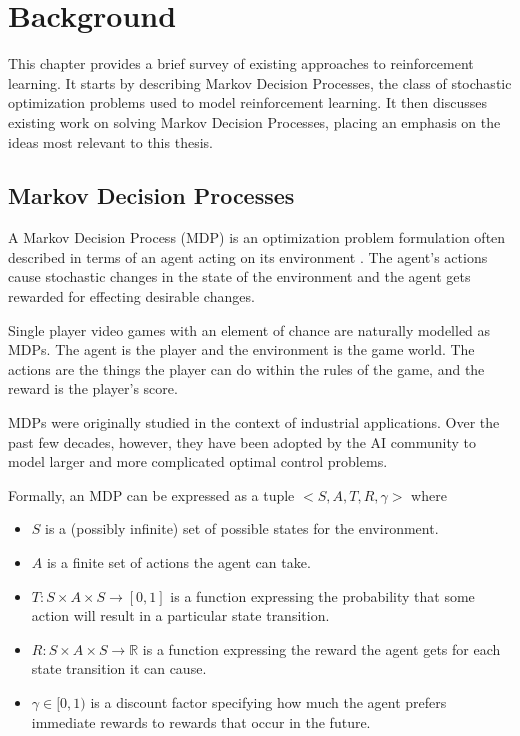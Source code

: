 \chapter{Background}

This chapter provides a brief survey of existing approaches to reinforcement learning.
It starts by describing Markov Decision Processes, the class of stochastic
optimization problems used to model reinforcement learning.
It then discusses existing work on solving Markov Decision Processes, placing
an emphasis on the ideas most relevant to this thesis.

\section{Markov Decision Processes}
A Markov Decision Process (MDP) is an optimization problem formulation 
often described in terms of an agent acting on its environment \cite{put}.
The agent's actions cause stochastic changes in the state of the environment
and the agent gets rewarded for effecting desirable changes.

Single player video games with an element of chance are naturally modelled
as MDPs.
The agent is the player and the environment is the game world.
The actions are the things the player can do within the rules of the game, and
the reward is the player's score.

MDPs were originally studied in the context of industrial applications.
Over the past few decades, however, they have been adopted by the AI
community to model larger and more complicated optimal control problems.

Formally, an MDP can be expressed as a tuple $<S,A,T,R,\gamma>$ where
\begin{itemize}
  \item$S$ is a (possibly infinite) set of possible states for the environment.
  \item $A$ is a finite set of actions the agent can take.
  \item $T:S \times A \times S \to [0,1]$ is a function expressing the
    probability that some action will result in a particular state transition.
  \item $R:S \times A \times S \to \mathbb{R}$ is a function expressing the
    reward the agent gets for each state transition it can cause.
  \item $\gamma \in [0,1)$ is a discount factor specifying how much the
    agent prefers immediate rewards to rewards that occur in the future.
\end{itemize}

